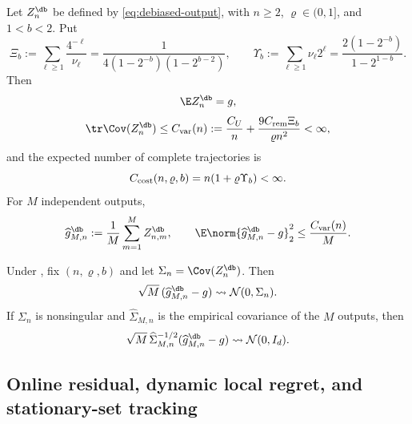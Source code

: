 \begin{theorem}\label{thm:estimator}
Let $Z_n^{\db}$ be defined by \eqref{eq:debiased-output}, with $n\ge2$, $\varrho\in(0,1]$, and $1<b<2$.  Put
\begin{equation}\label{eq:level-series-constants}
 \Xi_b
 :=\sum_{\ell\ge1}\frac{4^{-\ell}}{\nu_\ell}
 =\frac{1}{4(1-2^{-b})(1-2^{b-2})},
 \qquad
 \Upsilon_b
 :=\sum_{\ell\ge1}\nu_\ell2^\ell
 =\frac{2(1-2^{-b})}{1-2^{1-b}}.
\end{equation}
Then
\begin{equation}\label{eq:estimator-unbiased}
 \E Z_n^{\db}=g,
\end{equation}
\begin{equation}\label{eq:single-output-variance}
 \tr\Cov(Z_n^{\db})
 \le C_{\rm var}(n)
 :=\frac{C_U}{n}+\frac{9C_{\rm rem}\Xi_b}{\varrho n^2}<\infty,
\end{equation}
and the expected number of complete trajectories is
\begin{equation}\label{eq:expected-estimator-cost}
 C_{\rm cost}(n,\varrho,b)
 =n(1+\varrho\Upsilon_b)<\infty.
\end{equation}
For $M$ independent outputs,
\begin{equation}\label{eq:estimator-mse}
 \widehat g_{M,n}^{\db}:=\frac1M\sum_{m=1}^{M}Z_{n,m}^{\db},
 \qquad
 \E\norm{\widehat g_{M,n}^{\db}-g}_2^2
 \le\frac{C_{\rm var}(n)}{M}.
\end{equation}
\end{theorem}

\begin{theorem}\label{thm:clt}
Under , fix $(n,\varrho,b)$ and let $\Sigma_n=\Cov(Z_n^{\db})$.  Then
\begin{equation}\label{eq:clt}
 \sqrt M\,(\widehat g_{M,n}^{\db}-g)
 \rightsquigarrow \mathcal N(0,\Sigma_n).
\end{equation}
If $\Sigma_n$ is nonsingular and $\widehat\Sigma_{M,n}$ is the empirical covariance of the $M$ outputs, then
\begin{equation}\label{eq:studentized-clt}
 \sqrt M\,\widehat\Sigma_{M,n}^{-1/2}
 (\widehat g_{M,n}^{\db}-g)
 \rightsquigarrow \mathcal N(0,I_d).
\end{equation}
\end{theorem}

\subsection{Online residual, dynamic local regret, and stationary-set tracking}

